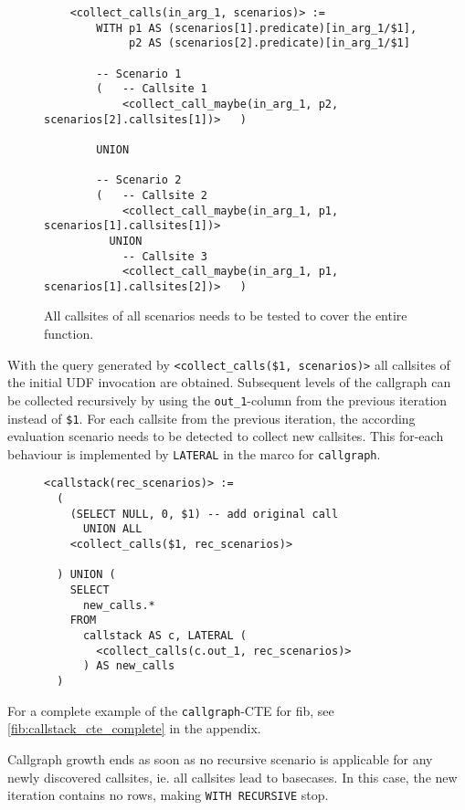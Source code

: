 \begin{figure}[h!]\centering\small
    \begin{verbatim}
    <collect_calls(in_arg_1, scenarios)> :=
        WITH p1 AS (scenarios[1].predicate)[in_arg_1/$1],
             p2 AS (scenarios[2].predicate)[in_arg_1/$1]
             
        -- Scenario 1
        (   -- Callsite 1
            <collect_call_maybe(in_arg_1, p2, scenarios[2].callsites[1])>   )
        
        UNION
        
        -- Scenario 2
        (   -- Callsite 2
            <collect_call_maybe(in_arg_1, p1, scenarios[1].callsites[1])>
          UNION
            -- Callsite 3
            <collect_call_maybe(in_arg_1, p1, scenarios[1].callsites[2])>   )
\end{verbatim}
  \caption{All callsites of all scenarios needs to be tested to cover the entire function.}
  \label{macro:collect_calls}
\end{figure}

With the query generated by \texttt{<collect\_calls(\$1, scenarios)>} all callsites of the initial UDF invocation are obtained. Subsequent levels of the callgraph can be collected recursively by using the \texttt{out\_1}-column from the previous iteration instead of \texttt{\$1}. For each callsite from the previous iteration, the according evaluation scenario needs to be detected to collect new callsites. This for-each behaviour is implemented by \texttt{LATERAL} in the marco for \texttt{callgraph}.

\begin{figure}[h!]\centering
\begin{verbatim}
<callstack(rec_scenarios)> :=
  (
    (SELECT NULL, 0, $1) -- add original call
      UNION ALL
    <collect_calls($1, rec_scenarios)> 

  ) UNION (
    SELECT
      new_calls.*
    FROM
      callstack AS c, LATERAL (
        <collect_calls(c.out_1, rec_scenarios)>
      ) AS new_calls
  )
\end{verbatim}
  \caption{}
  \label{}
\end{figure}

For a complete example of the \texttt{callgraph}-CTE for fib, see \autoref{fib:callstack_cte_complete} in the appendix.

Callgraph growth ends as soon as no recursive scenario is applicable for any newly discovered callsites, ie. all callsites lead to basecases. In this case, the new iteration contains no rows, making \texttt{WITH RECURSIVE} stop.

